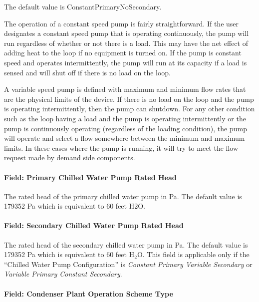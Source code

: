 The default value is ConstantPrimaryNoSecondary.

The operation of a constant speed pump is fairly straightforward. If the user designates a constant speed pump that is operating continuously, the pump will run regardless of whether or not there is a load. This may have the net effect of adding heat to the loop if no equipment is turned on. If the pump is constant speed and operates intermittently, the pump will run at its capacity if a load is sensed and will shut off if there is no load on the loop.

A variable speed pump is defined with maximum and minimum flow rates that are the physical limits of the device. If there is no load on the loop and the pump is operating intermittently, then the pump can shutdown. For any other condition such as the loop having a load and the pump is operating intermittently or the pump is continuously operating (regardless of the loading condition), the pump will operate and select a flow somewhere between the minimum and maximum limits. In these cases where the pump is running, it will try to meet the flow request made by demand side components.

\paragraph{Field: Primary Chilled Water Pump Rated Head}\label{field-primary-chilled-water-pump-rated-head}

The rated head of the primary chilled water pump in Pa. The default value is 179352 Pa which is equivalent to 60 feet H2O.

\paragraph{Field: Secondary Chilled Water Pump Rated Head}\label{field-secondary-chilled-water-pump-rated-head}

The rated head of the secondary chilled water pump in Pa. The default value is 179352 Pa which is equivalent to 60 feet H\(_{2}\)O. This field is applicable only if the ``Chilled Water Pump Configuration'' is \emph{Constant Primary Variable Secondary} or \emph{Variable Primary Constant Secondary}.

\paragraph{Field: Condenser Plant Operation Scheme Type}\label{field-condenser-plant-operation-scheme-type}

